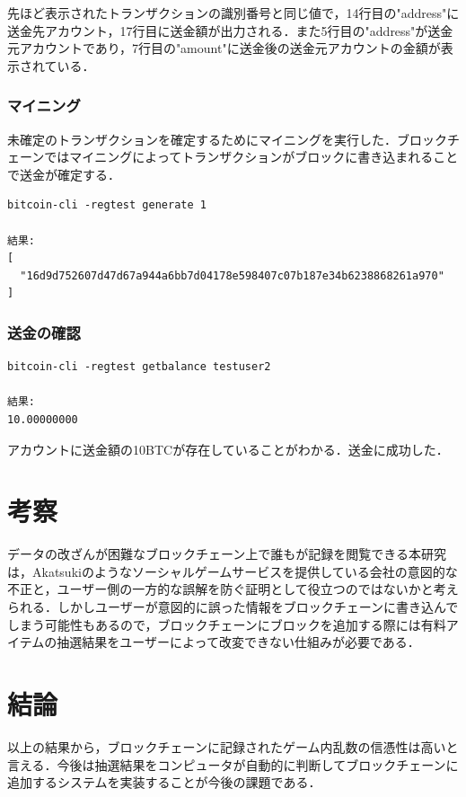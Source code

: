先ほど表示されたトランザクションの識別番号と同じ値で，14行目の"address"に送金先アカウント，17行目に送金額が出力される．また5行目の"address"が送金元アカウントであり，7行目の"amount"に送金後の送金元アカウントの金額が表示されている．

\newpage

\subsection{マイニング}
未確定のトランザクションを確定するためにマイニングを実行した．ブロックチェーンではマイニングによってトランザクションがブロックに書き込まれることで送金が確定する．

\begin{verbatim}
bitcoin-cli -regtest generate 1

結果:
[
  "16d9d752607d47d67a944a6bb7d04178e598407c07b187e34b6238868261a970"
]
\end{verbatim}

\subsection{送金の確認}
\begin{verbatim}
bitcoin-cli -regtest getbalance testuser2

結果:
10.00000000
\end{verbatim}

アカウントに送金額の10BTCが存在していることがわかる．送金に成功した．


\newpage

\chapter{考察}

データの改ざんが困難なブロックチェーン上で誰もが記録を閲覧できる本研究は，Akatsukiのようなソーシャルゲームサービスを提供している会社の意図的な不正と，ユーザー側の一方的な誤解を防ぐ証明として役立つのではないかと考えられる．しかしユーザーが意図的に誤った情報をブロックチェーンに書き込んでしまう可能性もあるので，ブロックチェーンにブロックを追加する際には有料アイテムの抽選結果をユーザーによって改変できない仕組みが必要である．


\newpage

\chapter{結論}

以上の結果から，ブロックチェーンに記録されたゲーム内乱数の信憑性は高いと言える．今後は抽選結果をコンピュータが自動的に判断してブロックチェーンに追加するシステムを実装することが今後の課題である．


